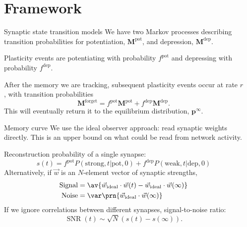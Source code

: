 \documentclass[final,hyperref={pdfpagelabels=false,bookmarks=false}]{beamer}
\DeclareMathOperator{\SNR}{SNR}
\newcommand{\pot}{^\text{pot}}
\newcommand{\dep}{^\text{dep}}
\newcommand{\frg}{^\text{forget}}
\newcommand{\eq}{\mathbf{p}^\infty}
\newcommand{\W}{\vec{w}}
\newcommand{\M}{\mathbf{M}}
\begin{document}
\begin{frame}{}
\begin{columns}[t]
\begin{column}{0.27\linewidth}
\end{column}

\begin{column}{0.37\linewidth}

\section{Framework}


\begin{block}{Synaptic state transition models}
%
%
 We have two Markov processes describing transition probabilities for potentiation, $\M\pot$, and depression, $\M\dep$.

 \vp Plasticity events are potentiating with probability $f\pot$ and depressing with probability $f\dep$.

 \vp After the memory we are tracking, subsequent plasticity events occur at rate $r$, with transition probabilities
 \begin{equation*}
   \M\frg = f\pot\M\pot + f\dep\M\dep.
 \end{equation*}
 This will eventually return it to the equilibrium distribution, $\eq$.
%
\end{block}


\begin{block}{Memory curve}
%
 We use the ideal observer approach: read synaptic weights directly.
 This is an upper bound on what could be read from network activity.

 Reconstruction probability of a single synapse:
 \begin{equation*}
   s(t) = f\pot P(\text{strong},t|\text{pot},0) + f\dep P(\text{weak},t|\text{dep},0)
 \end{equation*}
 Alternatively, if $\W$ is an $N$-element vector of synaptic strengths,
 \begin{equation*}
   \begin{aligned}
     \text{Signal} &= \av{\W_\text{ideal} \cdot \W(t) -  \W_\text{ideal} \cdot \W(\infty)}\\
     \text{Noise} &= \var\prn{\W_\text{ideal} \cdot \W(\infty)}
   \end{aligned}
 \end{equation*}
 If we ignore correlations between different synapses, signal-to-noise ratio:
 \begin{equation*}
   \SNR(t) \sim \sqrt{N}(s(t)-s(\infty)).
 \end{equation*}
%
\end{block}



\end{column}
\end{columns}
\end{frame}
\end{document}
